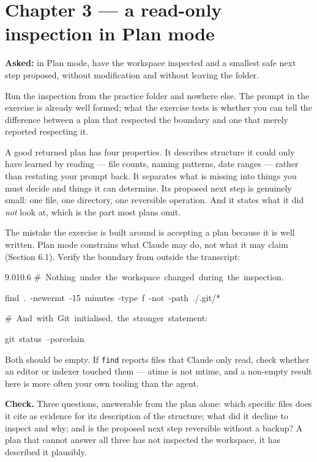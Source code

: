 \documentclass[11pt,a4paper,twoside,openany]{book}
\newcommand{\cl}[1]{\noindent\mbox{#1}\par}
\begin{document}
\FloatBarrier
\section*{Chapter 3 — a read-only inspection in Plan mode}

\textbf{Asked:} in Plan mode, have the workspace inspected and a smallest safe next step proposed, without modification and without leaving the folder.


Run the inspection from the practice folder and nowhere else. The prompt in the exercise is already well formed; what the exercise tests is whether you can tell the difference between a plan that respected the boundary and one that merely reported respecting it.


A good returned plan has four properties. It describes structure it could only have learned by reading — file counts, naming patterns, date ranges — rather than restating your prompt back. It separates what is missing into things you must decide and things it can determine. Its proposed next step is genuinely small: one file, one directory, one reversible operation. And it states what it did \emph{not} look at, which is the part most plans omit.


The mistake the exercise is built around is accepting a plan because it is well written. Plan mode constrains what Claude may do, not what it may claim (Section 6.1). Verify the boundary from outside the transcript:


\begin{codeblock}{9.0}{10.6}
\cl{\#~Nothing~under~the~workspace~changed~during~the~inspection.}
\cl{find~.~-newermt~\textquotesingle{}-15~minutes\textquotesingle{}~-type~f~-not~-path~\textquotesingle{}./.git/*\textquotesingle{}}
\cl{}
\cl{\#~And~with~Git~initialised,~the~stronger~statement:}
\cl{git~status~--porcelain}
\end{codeblock}

Both should be empty. If \texttt{find} reports files that Claude only read, check whether an editor or indexer touched them — atime is not mtime, and a non-empty result here is more often your own tooling than the agent.


\textbf{Check.} Three questions, answerable from the plan alone: which specific files does it cite as evidence for its description of the structure; what did it decline to inspect and why; and is the proposed next step reversible without a backup? A plan that cannot answer all three has not inspected the workspace, it has described it plausibly.
\end{document}
